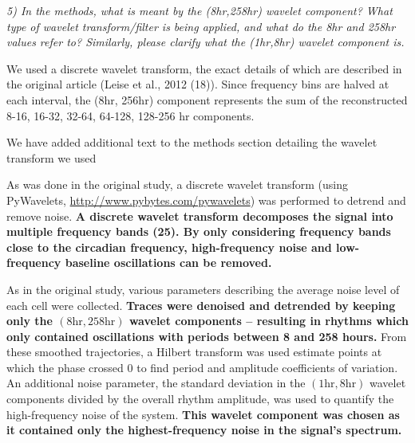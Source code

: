 \documentclass[11pt, letterpaper]{article}
\newenvironment{reviewer}{\itshape\color{gray}}{}
\newenvironment{manuscript}[1]{\begin{center}\begin{tcolorbox}[colback=green!5!white,colframe=green!75!black,width=\textwidth,title={#1},breakable,fonttitle=\bfseries]}{\end{tcolorbox}\end{center}}
\begin{document}
\begin{reviewer}
5) In the methods, what is meant by the (8hr,258hr) wavelet component? What type of wavelet transform/filter is being applied, and what do the 8hr and 258hr values refer to? Similarly, please clarify what the (1hr,8hr) wavelet component is.
\end{reviewer}

We used a discrete wavelet transform, the exact details of which are described in the original article (Leise et al., 2012 (18)).
Since frequency bins are halved at each interval, the (8hr, 256hr) component represents the sum of the reconstructed 8-16, 16-32, 32-64, 64-128, 128-256 hr components.

We have added additional text to the methods section detailing the wavelet transform we used

\begin{manuscript}{Pages 10}
  As was done in the original study, a discrete wavelet transform (using PyWavelets, \url{http://www.pybytes.com/pywavelets}) was performed to detrend and remove noise. {\bfseries A discrete wavelet transform decomposes the signal into multiple frequency bands (25). By only considering frequency bands close to the circadian frequency, high-frequency noise and low-frequency baseline oscillations can be removed.}
\end{manuscript}

\begin{manuscript}{Page 10}
As in the original study, various parameters describing the average noise level of each cell were collected.
{\bfseries
Traces were denoised and detrended by keeping only the $(8 \text{hr}, 258 \text{hr})$ wavelet components -- resulting in rhythms which only contained oscillations with periods between 8 and 258 hours.
}
From these smoothed trajectories, a Hilbert transform was used estimate points at which the phase crossed $0$ to find period and amplitude coefficients of variation.
An additional noise parameter, the standard deviation in the $(1 \text{hr}, 8 \text{hr})$ wavelet components divided by the overall rhythm amplitude, was used to quantify the high-frequency noise of the system.
{\bfseries
This wavelet component was chosen as it contained only the highest-frequency noise in the signal's spectrum.
}
\end{manuscript}
\end{document}
